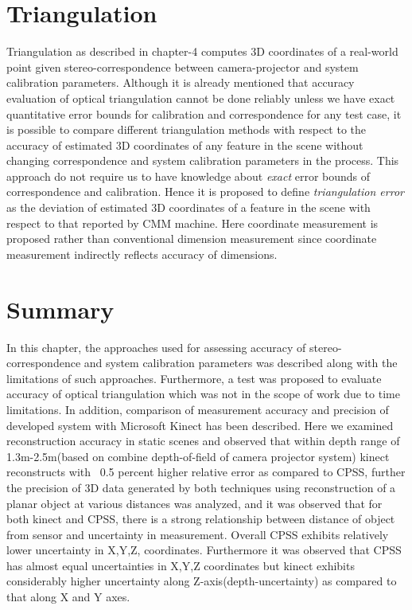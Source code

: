 \section{Triangulation}
Triangulation as described in chapter-4 computes 3D coordinates of a real-world point given stereo-correspondence between camera-projector and system calibration parameters. Although it is already mentioned that accuracy evaluation of optical triangulation cannot be done reliably unless we have exact quantitative error bounds for calibration and correspondence for any test case, it is possible to compare different triangulation methods with respect to the accuracy of estimated 3D coordinates of any feature in the scene without changing correspondence and system calibration parameters in the process. This approach do not require us to have knowledge about \textit{exact} error bounds of correspondence and calibration. Hence it is proposed to define \textit{triangulation error} as the deviation of estimated 3D coordinates of a feature in the scene with respect to that reported by CMM machine. Here coordinate measurement is proposed rather than conventional dimension measurement since coordinate measurement indirectly reflects accuracy of dimensions.








\section{Summary}
In this chapter, the approaches used for assessing accuracy of stereo-correspondence and system calibration parameters was described along with the limitations of such approaches. Furthermore, a test was proposed to evaluate accuracy of optical triangulation which was not in the scope of work due to time limitations.\newline
\indent In addition, comparison of measurement accuracy and precision of developed system with Microsoft Kinect has been described. Here we examined reconstruction accuracy in static scenes and observed that within depth range of 1.3m-2.5m(based on combine depth-of-field of camera projector system) kinect reconstructs with ~0.5 percent higher relative error as compared to CPSS, further the precision of 3D data generated by both techniques using reconstruction of a planar object at various distances was analyzed, and it was observed that for both kinect and CPSS, there is a strong relationship between distance of object from sensor and uncertainty in measurement. Overall CPSS exhibits relatively lower uncertainty in X,Y,Z, coordinates. Furthermore it was observed that CPSS has almost equal uncertainties in X,Y,Z coordinates but kinect exhibits considerably higher uncertainty along Z-axis(depth-uncertainty) as compared to that along X and Y axes.

 
